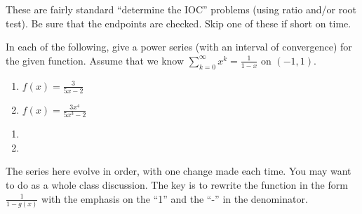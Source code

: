 \documentclass[]{ximera}
\begin{document}
\begin{instructorNotes}
These are fairly standard ``determine the IOC'' problems (using ratio and/or root test).  
Be sure that the endpoints are checked.  
Skip one of these if short on time.
\end{instructorNotes}







\begin{problem}
In each of the following, give a power series (with an interval of convergence) for the given function.  
Assume that we know $\sum_{k=0}^\infty x^k = \frac{1}{1-x}$ on $(-1,1)$.  
	\begin{multicols}{2}
	\begin{enumerate}
	\item  $f(x) = \frac{3}{5x-2}$
	\item  $f(x) = \frac{3x^4}{5x^3 - 2}$
	\end{enumerate}
	\end{multicols}
	
	\begin{freeResponse}
	\begin{enumerate}
	\item
	
	\item
	
	\end{enumerate}
	\end{freeResponse}

\end{problem}

\begin{instructorNotes}
The series here evolve in order, with one change made each time.  
You may want to do as a whole class discussion.  
The key is to rewrite the function in the form $\frac{1}{1-g(x)}$ with the emphasis on the ``1'' and the ``-'' in the denominator.
\end{instructorNotes}
\end{document}
